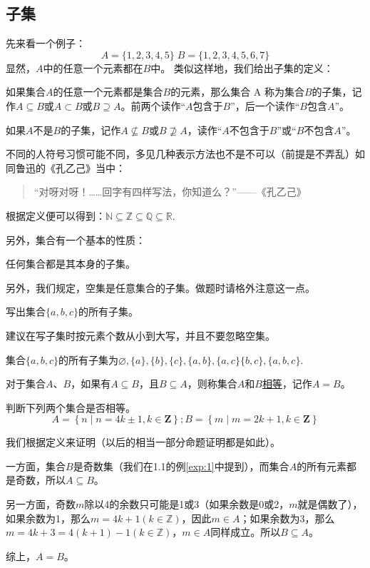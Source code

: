 \documentclass[lang=cn,math=cm,chinesefont=nofont,11pt,scheme=chinese,onecol]{elegantbook}
\begin{document}
\subsection{子集}
先来看一个例子：$$A=\{1,2,3,4,5\}\;B=\{1,2,3,4,5,6,7\}$$
显然，$A$中的任意一个元素都在$B$中。
类似这样地，我们给出子集的定义：
\begin{definition}[子集]
  如果集合$A$的任意一个元素都是集合$B$的元素，那么集合 A 称为集合$B$的子集，记作$A\subseteq B$或$A\subset B$或$B\supseteq A$。前两个读作“$A$包含于$B$”，后一个读作“$B$包含$A$”。

  如果$A$不是$B$的子集，记作$A\nsubseteq B$或$B\nsupseteq A$，读作“$A$不包含于$B$”或“$B$不包含$A$”。
\end{definition}
不同的人符号习惯可能不同，多见几种表示方法也不是不可以（前提是不弄乱）如同鲁迅的《孔乙己》当中：
\begin{quotation}
  “对呀对呀！……回字有四样写法，你知道么？”——《孔乙己》
\end{quotation}

根据定义便可以得到：$\mathbb{N}\subseteq\mathbb{Z}\subseteq\mathbb{Q}\subseteq\mathbb{R}$.

  另外，集合有一个基本的性质：
\begin{property}
  任何集合都是其本身的子集。
\end{property}

另外，我们规定，空集是任意集合的子集。做题时请格外注意这一点。

\begin{example}
  写出集合$\{a,b,c\}$的所有子集。
\end{example}
\begin{remark}
  建议在写子集时按元素个数从小到大写，并且不要忽略空集。
\end{remark}
\begin{solution}
  集合$\{a,b,c\}$的所有子集为$\varnothing ,\{a\},\{b\},\{c\},\{a,b\},\{a,c\}\{b,c\},\{a,b,c\}$.
\end{solution}
\begin{definition}[集合的相等]
  对于集合$A$、$B$，如果有$A\subseteq B$，且$B\subseteq A$，则称集合$A$和$B$\underline{相等}，记作$A=B$。
\end{definition}

\begin{example}\label{exap:2}
  判断下列两个集合是否相等。
  $$A=\left\{n\mid n=4k\pm1,k\in\mathbf{Z}\right\};B=\left\{m\mid m=2k+1,k\in\mathbf{Z}\right\}$$
\end{example}
\begin{solution}
  我们根据定义来证明（以后的相当一部分命题证明都是如此）。

一方面，集合$B$是奇数集（我们在1.1的例\ref{exp:1}中提到），而集合$A$的所有元素都是奇数，所以$A\subseteq B$。

另一方面，奇数$m$除以4的余数只可能是1或3（如果余数是0或2，$m$就是偶数了），如果余数为1，那么$m=4k+1(k\in\mathbb{Z})$，因此$m\in A$；如果余数为3，那么$m=4k+3=4(k+1)-1(k\in\mathbb{Z})$，$m\in A$同样成立。所以$B\subseteq A$。

综上，$A=B$。
\end{solution}
\end{document}
